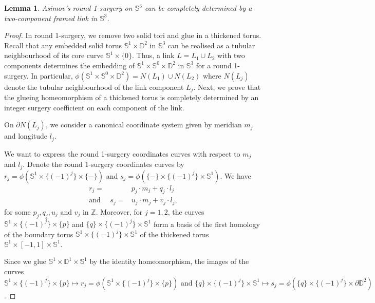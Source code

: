 \documentclass{amsart}
\theoremstyle{plain}
\newtheorem{lem}{Lemma}
\theoremstyle{remark}
\theoremstyle{definition}
\newcommand{\s}{\mathbb{S}}
\newcommand{\D}{\mathbb{D}}
\begin{document}
 
\begin{lem} \label{Lem:R1Diagram}
Asimov's round 1-surgery on $\s^3$ can be completely determined by a two-component framed link in $\s^3$. 
\end{lem}

\begin{proof}
In round 1-surgery, we remove two solid tori and glue in a thickened torus. 
Recall that any embedded solid torus $\s^1 \times \D^2$ in $\mathbb{S}^3$ can be realised as a tubular neighbourhood of its core curve $\s^1 \times \{0\}$. 
Thus, a link $L= L_1 \cup L_2$ with two components determines the embedding of $\s^1 \times \s^0 \times \D^2$ in $\s^3$ for a round 1-surgery. 
In particular, $\phi(\s^1 \times \s^0 \times \D^2)= N(L_1) \cup N(L_2)$ where $N({L_j})$ denote the tubular neighbourhood of the link component $L_j$. 
Next, we prove that the glueing homeomorphism of a thickened torus is completely determined by an integer surgery coefficient on each component of the link. 

On $\partial N(L_j)$, we consider a canonical coordinate system given by meridian $m_j$ and longitude $l_j$. 

We want to express the round 1-surgery coordinates curves with respect to $m_{j}$ and $l_{j}$.
Denote the round 1-surgery coordinates curves by $r_{j}=\phi(\s^1 \times \{(-1)^j\} \times \{-\})$ and $ s_{j}= \phi(\{-\} \times \{(-1)^j\} \times \s^1)$. 
We have
\begin{eqnarray*}
    r_{j} =&  p_{j}\cdot m_{j} + q_{j}\cdot  l_{j}\\
   \text{and } \quad s_{j} =& u_{j}\cdot  m_{j} + v_{j} \cdot l_{j},
\end{eqnarray*}
for some $p_{j}, q_{j}, u_{j} \text{ and } v_{j}$ in $\mathbb{Z}$. 
Moreover, for $j=1,2$, the curves $\s^1 \times \{(-1)^j\} \times \{p\}$ and $\{q\} \times \{(-1)^j\} \times \s^1$ form a basis of the first homology of the boundary torus $\s^1 \times \{(-1)^j\}\times \s^1$ of the thickened torus $\s^1 \times [-1,1]\times \s^1$. 

Since we glue $\s^1\times \D^1 \times \s^1$ by the identity homeomorphism, the images of the curves $\s^1 \times \{(-1)^j\}\times \{p\} \mapsto  r_{j} = \phi(\s^1 \times \{(-1)^j\} \times \{p\}) \text{ and } \{q\} \times \{(-1)^j\}\times \s^1 \mapsto s_{j} =\phi(\{q\} \times \{(-1)^j\} \times \partial \D^2)$. 


\end{proof}
\end{document}
